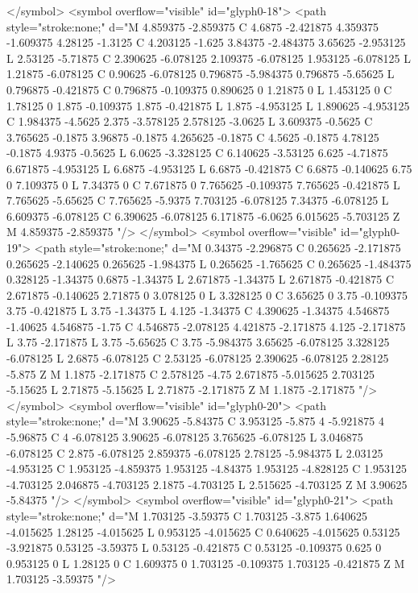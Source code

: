 </symbol>
<symbol overflow="visible" id="glyph0-18">
<path style="stroke:none;" d="M 4.859375 -2.859375 C 4.6875 -2.421875 4.359375 -1.609375 4.28125 -1.3125 C 4.203125 -1.625 3.84375 -2.484375 3.65625 -2.953125 L 2.53125 -5.71875 C 2.390625 -6.078125 2.109375 -6.078125 1.953125 -6.078125 L 1.21875 -6.078125 C 0.90625 -6.078125 0.796875 -5.984375 0.796875 -5.65625 L 0.796875 -0.421875 C 0.796875 -0.109375 0.890625 0 1.21875 0 L 1.453125 0 C 1.78125 0 1.875 -0.109375 1.875 -0.421875 L 1.875 -4.953125 L 1.890625 -4.953125 C 1.984375 -4.5625 2.375 -3.578125 2.578125 -3.0625 L 3.609375 -0.5625 C 3.765625 -0.1875 3.96875 -0.1875 4.265625 -0.1875 C 4.5625 -0.1875 4.78125 -0.1875 4.9375 -0.5625 L 6.0625 -3.328125 C 6.140625 -3.53125 6.625 -4.71875 6.671875 -4.953125 L 6.6875 -4.953125 L 6.6875 -0.421875 C 6.6875 -0.140625 6.75 0 7.109375 0 L 7.34375 0 C 7.671875 0 7.765625 -0.109375 7.765625 -0.421875 L 7.765625 -5.65625 C 7.765625 -5.9375 7.703125 -6.078125 7.34375 -6.078125 L 6.609375 -6.078125 C 6.390625 -6.078125 6.171875 -6.0625 6.015625 -5.703125 Z M 4.859375 -2.859375 "/>
</symbol>
<symbol overflow="visible" id="glyph0-19">
<path style="stroke:none;" d="M 0.34375 -2.296875 C 0.265625 -2.171875 0.265625 -2.140625 0.265625 -1.984375 L 0.265625 -1.765625 C 0.265625 -1.484375 0.328125 -1.34375 0.6875 -1.34375 L 2.671875 -1.34375 L 2.671875 -0.421875 C 2.671875 -0.140625 2.71875 0 3.078125 0 L 3.328125 0 C 3.65625 0 3.75 -0.109375 3.75 -0.421875 L 3.75 -1.34375 L 4.125 -1.34375 C 4.390625 -1.34375 4.546875 -1.40625 4.546875 -1.75 C 4.546875 -2.078125 4.421875 -2.171875 4.125 -2.171875 L 3.75 -2.171875 L 3.75 -5.65625 C 3.75 -5.984375 3.65625 -6.078125 3.328125 -6.078125 L 2.6875 -6.078125 C 2.53125 -6.078125 2.390625 -6.078125 2.28125 -5.875 Z M 1.1875 -2.171875 C 2.578125 -4.75 2.671875 -5.015625 2.703125 -5.15625 L 2.71875 -5.15625 L 2.71875 -2.171875 Z M 1.1875 -2.171875 "/>
</symbol>
<symbol overflow="visible" id="glyph0-20">
<path style="stroke:none;" d="M 3.90625 -5.84375 C 3.953125 -5.875 4 -5.921875 4 -5.96875 C 4 -6.078125 3.90625 -6.078125 3.765625 -6.078125 L 3.046875 -6.078125 C 2.875 -6.078125 2.859375 -6.078125 2.78125 -5.984375 L 2.03125 -4.953125 C 1.953125 -4.859375 1.953125 -4.84375 1.953125 -4.828125 C 1.953125 -4.703125 2.046875 -4.703125 2.1875 -4.703125 L 2.515625 -4.703125 Z M 3.90625 -5.84375 "/>
</symbol>
<symbol overflow="visible" id="glyph0-21">
<path style="stroke:none;" d="M 1.703125 -3.59375 C 1.703125 -3.875 1.640625 -4.015625 1.28125 -4.015625 L 0.953125 -4.015625 C 0.640625 -4.015625 0.53125 -3.921875 0.53125 -3.59375 L 0.53125 -0.421875 C 0.53125 -0.109375 0.625 0 0.953125 0 L 1.28125 0 C 1.609375 0 1.703125 -0.109375 1.703125 -0.421875 Z M 1.703125 -3.59375 "/>
